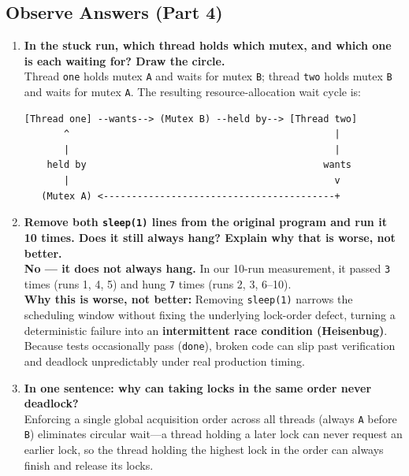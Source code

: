 \documentclass[12pt,a4paper]{article}
\begin{document}
\subsection{Observe Answers (Part 4)}
\begin{enumerate}
    \item \textbf{In the stuck run, which thread holds which mutex, and which one is each waiting for? Draw the circle.} \\
    Thread \texttt{one} holds mutex \texttt{A} and waits for mutex \texttt{B}; thread \texttt{two} holds mutex \texttt{B} and waits for mutex \texttt{A}. The resulting resource-allocation wait cycle is:
\begin{lstlisting}[style=consolestyle, caption={Circular-wait cycle in the deadlocked run}]
  [Thread one] --wants--> (Mutex B) --held by--> [Thread two]
       ^                                               |
       |                                               |
    held by                                          wants
       |                                               v
   (Mutex A) <-----------------------------------------+
\end{lstlisting}

    \item \textbf{Remove both \texttt{sleep(1)} lines from the original program and run it 10 times. Does it still always hang? Explain why that is worse, not better.} \\
    \textbf{No --- it does not always hang.} In our 10-run measurement, it passed \texttt{3} times (runs 1, 4, 5) and hung \texttt{7} times (runs 2, 3, 6--10). \\
    \textbf{Why this is worse, not better:} Removing \texttt{sleep(1)} narrows the scheduling window without fixing the underlying lock-order defect, turning a deterministic failure into an \textbf{intermittent race condition (Heisenbug)}. Because tests occasionally pass (\texttt{done}), broken code can slip past verification and deadlock unpredictably under real production timing.

    \item \textbf{In one sentence: why can taking locks in the same order never deadlock?} \\
    Enforcing a single global acquisition order across all threads (always \texttt{A} before \texttt{B}) eliminates circular wait---a thread holding a later lock can never request an earlier lock, so the thread holding the highest lock in the order can always finish and release its locks.
\end{enumerate}
\end{document}
